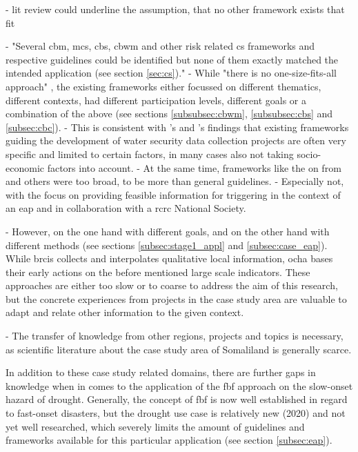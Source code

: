 - lit review could underline the assumption, that no other framework exists that fit

- "Several \acrshort{cbm}, \acrshort{mcs}, \acrshort{cbs}, \acrshort{cbwm} and other risk related \acrshort{cs} frameworks and respective guidelines could be identified but none of them exactly matched the intended application (see section \ref{sec:cs})."
- While "there is no one-size-fits-all approach" \autocite[2]{fraislCitizenScienceEnvironmental2022}, the existing frameworks either focussed on different thematics, different contexts, had different participation levels, different goals or a combination of the above (see sections \ref{subsubsec:cbwm}, \ref{subsubsec:cbs} and \ref{subsec:cbc}).
- This is consistent with \autocite{butteFrameworkWaterSecurity2022}'s and \autocite{carrionCROWDSOURCINGWATERQUALITY2020}'s findings that existing frameworks guiding the development of water security data collection projects are often very specific and limited to certain factors, in many cases also not taking socio-economic factors into account. 
- At the same time, frameworks like the on from \autocite{butteFrameworkWaterSecurity2022,eu-citizen.scienceEUCitizenScience,citizenscience.govBasicStepsYour} and others were too broad, to be more than general guidelines.
- Especially not, with the focus on providing feasible information for triggering  in the context of an \acrshort{eap} and in collaboration with a \acrshort{rcrc} National Society.

- However, on the one hand with different goals, and on the other hand with different methods (see sections \ref{subsec:stage1_appl} and \ref{subsec:case_eap}). While \acrshort{brcis} collects and interpolates qualitative local information, \acrshort{ocha} bases their early actions on the before mentioned large scale indicators. These approaches are either too slow or to coarse to address the aim of this research, but the concrete experiences from projects in the case study area are valuable to adapt and relate other information to the given context. 

- The transfer of knowledge from other regions, projects and topics is necessary, as scientific literature about the case study area of Somaliland is generally scarce.

In addition to these case study related domains, there are further gaps in knowledge when in comes to the application of the \acrshort{fbf} approach on the slow-onset hazard of drought. Generally, the concept of \acrshort{fbf} is now well established in regard to fast-onset disasters, but the drought use case is relatively new (2020) and not yet well researched, which severely limits the amount of guidelines and frameworks available for this particular application (see section \ref{subsec:eap}).

